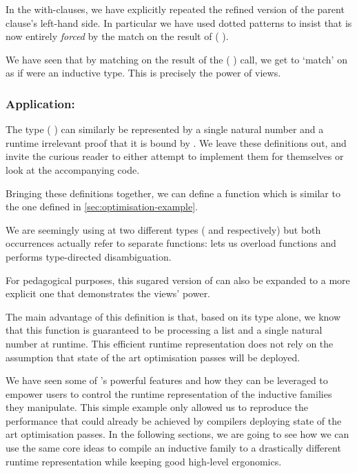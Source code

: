 In the with-clauses, we have explicitly repeated the refined version
of the parent clause's left-hand side. In particular we have used dotted
patterns to insist that  is now entirely \emph{forced}
by the match on the result of ( ).

We have seen that by matching on the result of the
( ) call,
we get to `match' on  as if  were an
inductive type.
%
This is precisely the power of views.

\subsubsection{Application: }

The type ( ) can similarly be represented by a
single natural number and a runtime irrelevant proof that it is bound by
.
%
We leave these definitions out, and invite the curious reader
to either attempt to implement them for themselves or look at the accompanying code.

Bringing these definitions together, we can define a 
function which is  similar to the one defined in \cref{sec:optimisation-example}.


We are seemingly using  at two different types (
and  respectively) but both occurrences actually refer to separate
functions: \idris{} lets us overload functions and performs type-directed disambiguation.

For pedagogical purposes, this sugared version of  can
also be expanded to a more explicit one that demonstrates the views' power.



The main advantage of this definition is that, based on its type alone, we know
that this function is guaranteed to be processing a list and a single natural
number at runtime.
%
This efficient runtime representation does not rely on the assumption that state
of the art optimisation passes will be deployed.


We have seen some of \idris{}'s powerful features and how they can be leveraged
to empower users to control the runtime representation of the inductive families
they manipulate.
%
This simple example only allowed us to reproduce the performance that could already
be achieved by compilers deploying state of the art optimisation passes.
%
In the following sections, we are going to see how we can use the same core ideas
to compile an inductive family to a drastically different runtime representation
while keeping good high-level ergonomics.
